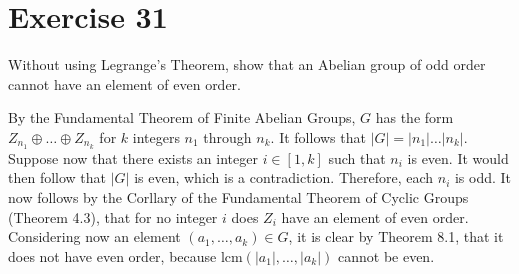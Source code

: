 \documentclass[12pt]{article}
\newcommand{\lcm}{\mbox{lcm}}
\begin{document}
\section*{Exercise 31}

Without using Legrange's Theorem, show that an Abelian group of odd order
cannot have an element of even order.

By the Fundamental Theorem of Finite Abelian Groups,
$G$ has the form $Z_{n_1}\oplus\dots\oplus Z_{n_k}$
for $k$ integers $n_1$ through $n_k$.  It follows that
$|G|=|n_1|\dots |n_k|$.
Suppose now that there exists an integer $i\in[1,k]$ such that $n_i$ is even.
It would then follow that $|G|$ is even, which is a contradiction.
Therefore, each $n_i$ is odd.
It now follows by the Corllary of the Fundamental Theorem of Cyclic Groups (Theorem 4.3),
that for no integer $i$ does $Z_i$ have an element of even order.
Considering now an element $(a_1,\dots,a_k)\in G$, it is clear
by Theorem 8.1, that it does not have even order, because
$\lcm(|a_1|,\dots,|a_k|)$ cannot be even.
\end{document}
